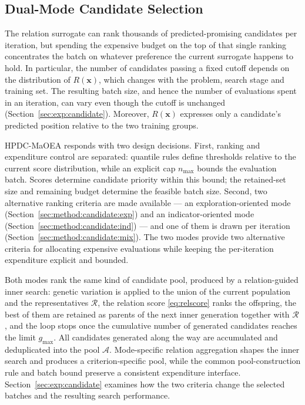 \documentclass[final,5p,times,twocolumn]{elsarticle}
\newcommand{\vx}{\mathbf{x}}
\begin{document}
\subsection{Dual-Mode Candidate Selection}
\label{sec:method:candidate}

The relation surrogate can rank thousands of predicted-promising candidates per
iteration, but spending the expensive budget on the top of that single ranking
concentrates the batch on whatever preference the current surrogate happens to
hold. In particular, the number of candidates passing a fixed cutoff depends on
the distribution of $R(\vx)$, which changes with the problem, search stage and
training set. The resulting batch size, and hence the number of evaluations
spent in an iteration, can vary even though the cutoff is unchanged
(Section~\ref{sec:exp:candidate}). Moreover, $R(\vx)$ expresses only a
candidate's predicted position relative to the two training groups.

HPDC-MaOEA responds with two design decisions. First, ranking and expenditure
control are separated: quantile rules define thresholds relative to the current
score distribution, while an explicit cap $n_{\max}$ bounds the evaluation
batch. Scores determine candidate priority within this bound; the retained-set
size and remaining budget determine the feasible batch size. Second, two alternative ranking
criteria are made available --- an exploration-oriented mode
(Section~\ref{sec:method:candidate:exp}) and an indicator-oriented mode
(Section~\ref{sec:method:candidate:ind}) --- and one of them is drawn per
iteration (Section~\ref{sec:method:candidate:mix}). The two modes provide two
alternative criteria for allocating expensive evaluations while keeping the
per-iteration expenditure explicit and bounded.

Both modes rank the same kind of candidate pool, produced by a relation-guided
inner search: genetic variation is applied to the union of the current
population and the representatives $\mathcal{R}$, the relation score
\eqref{eq:relscore} ranks the offspring, the best of them are retained as
parents of the next inner generation together with $\mathcal{R}$, and the loop
stops once the cumulative number of generated candidates reaches the limit
$g_{\max}$. All candidates generated along the way are accumulated and
deduplicated into the pool $\mathcal{A}$. Mode-specific relation aggregation
shapes the inner search and produces a criterion-specific pool, while the common
pool-construction rule and batch bound preserve a consistent expenditure
interface. Section~\ref{sec:exp:candidate} examines how the two criteria change
the selected batches and the resulting search performance.
\end{document}
